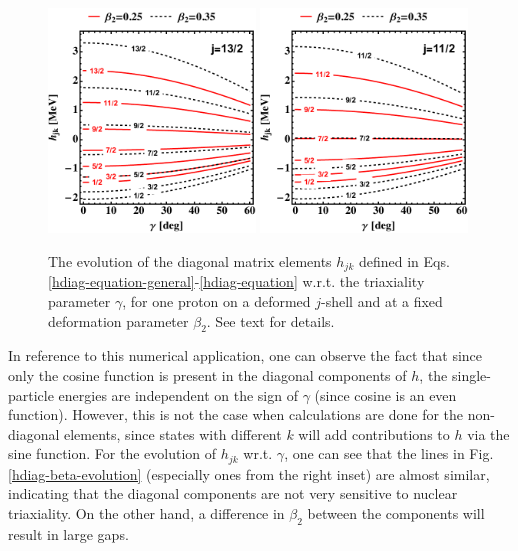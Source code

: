 \begin{figure}
    \centering
    \includegraphics[width=0.49\textwidth]{Chapters/Figures/hdiag-gamma-1.pdf}
    \includegraphics[width=0.49\textwidth]{Chapters/Figures/hdiag-gamma-2.pdf}
    \caption{The evolution of the diagonal matrix elements $h_{jk}$ defined in Eqs. \ref{hdiag-equation-general}-\ref{hdiag-equation} w.r.t. the triaxiality parameter $\gamma$, for one proton on a deformed $j$-shell and at a fixed deformation parameter $\beta_2$. See text for details.}
    \label{hdiag-gamma-evolution}
\end{figure}

In reference to this numerical application, one can observe the fact that since only the cosine function is present in the diagonal components of $h$, the single-particle energies are independent on the sign of $\gamma$ (since cosine is an even function). However, this is not the case when calculations are done for the non-diagonal elements, since states with different $k$ will add contributions to $h$ via the sine function. For the evolution of $h_{jk}$ wr.t. $\gamma$, one can see that the lines in Fig. \ref{hdiag-beta-evolution} (especially ones from the right inset) are almost similar, indicating that the diagonal components are not very sensitive to nuclear triaxiality. On the other hand, a difference in $\beta_2$ between the components will result in large gaps.


